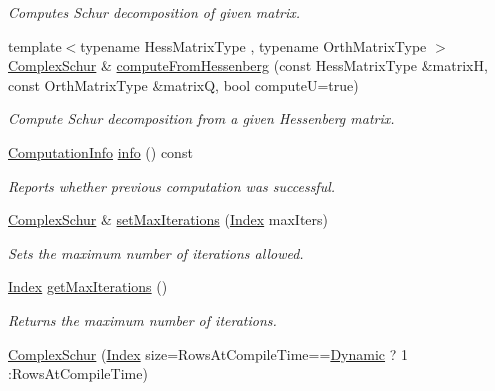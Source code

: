 \begin{DoxyCompactItemize}
\begin{DoxyCompactList}\small\item\em Computes Schur decomposition of given matrix. \end{DoxyCompactList}\item 
{\footnotesize template$<$typename Hess\+Matrix\+Type , typename Orth\+Matrix\+Type $>$ }\\\hyperlink{group___eigenvalues___module_class_eigen_1_1_complex_schur}{Complex\+Schur} \& \hyperlink{group___eigenvalues___module_a05dfbf329047aba756a844f8fe2de314}{compute\+From\+Hessenberg} (const Hess\+Matrix\+Type \&matrixH, const Orth\+Matrix\+Type \&matrixQ, bool computeU=true)
\begin{DoxyCompactList}\small\item\em Compute Schur decomposition from a given Hessenberg matrix. \end{DoxyCompactList}\item 
\hyperlink{group__enums_ga85fad7b87587764e5cf6b513a9e0ee5e}{Computation\+Info} \hyperlink{group___eigenvalues___module_a8c5ee15fecfd126fc362c3f2fd28f51e}{info} () const
\begin{DoxyCompactList}\small\item\em Reports whether previous computation was successful. \end{DoxyCompactList}\item 
\hyperlink{group___eigenvalues___module_class_eigen_1_1_complex_schur}{Complex\+Schur} \& \hyperlink{group___eigenvalues___module_a6ca227fbd5387f3a625351354b8eec44}{set\+Max\+Iterations} (\hyperlink{group___eigenvalues___module_a652104d13723a5b1db2937866a034557}{Index} max\+Iters)
\begin{DoxyCompactList}\small\item\em Sets the maximum number of iterations allowed. \end{DoxyCompactList}\item 
\mbox{\label{group___eigenvalues___module_a2fc0b7bc409a49e7cdb7b6edcfff26eb}} 
\hyperlink{group___eigenvalues___module_a652104d13723a5b1db2937866a034557}{Index} \hyperlink{group___eigenvalues___module_a2fc0b7bc409a49e7cdb7b6edcfff26eb}{get\+Max\+Iterations} ()
\begin{DoxyCompactList}\small\item\em Returns the maximum number of iterations. \end{DoxyCompactList}\item 
\hyperlink{group___eigenvalues___module_ad707d9978dc36b3b15e460c2a83f4093}{Complex\+Schur} (\hyperlink{group___eigenvalues___module_a652104d13723a5b1db2937866a034557}{Index} size=Rows\+At\+Compile\+Time==\hyperlink{namespace_eigen_ad81fa7195215a0ce30017dfac309f0b2}{Dynamic} ? 1 \+:Rows\+At\+Compile\+Time)

\end{DoxyCompactItemize}
